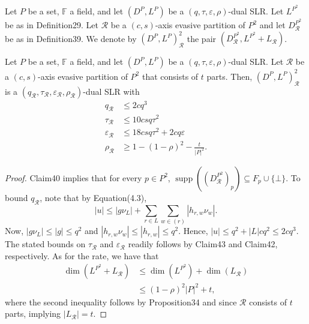 \begin{ntdefinition}
Let $P$ be a set, $\mathbb F$ a field, and let $(D^P,L^P)$ be a $(q,\tau,\varepsilon,\rho)$-dual SLR. Let $L^{P^2}$ be as in Definition29. Let $\mathcal R$ be a $(c,s)$-axis evasive partition of $P^2$ and let $D_{\mathcal R}^{P^2}$ be as in Definition39. We denote by $(D^P,L^P)^2_{\mathcal R}$ the pair $(D_{\mathcal R}^{P^2},L^{P^2}+L_{\mathcal R})$.
\end{ntdefinition}
\begin{ntproposition}
Let $P$ be a set, $\mathbb F$ a field, and let $(D^P,L^P)$ be a $(q,\tau,\varepsilon,\rho)$-dual SLR. Let $\mathcal R$ be a $(c,s)$-axis evasive partition of $P^2$ that consists of $t$ parts. Then, $(D^P,L^P)^2_{\mathcal R}$ is a $(q_{\mathcal R},\tau_{\mathcal R},\varepsilon_{\mathcal R},\rho_{\mathcal R})$-dual SLR with
\begin{align*}q_{\mathcal R}&\leq2cq^3\\\tau_{\mathcal R}&\leq10csq\tau^2\\\varepsilon_{\mathcal R}&\leq18csq\tau^2+2cq\varepsilon\\\rho_{\mathcal R}&\geq1-(1-\rho)^2-\frac t{|P|^2}.\end{align*}
\end{ntproposition}
\begin{proof}
Claim40 implies that for every $p\in P^2$, $\operatorname{supp}((D_{\mathcal R}^{P^2})_p)\subseteq F_p\cup\{\bot\}$. To bound $q_{\mathcal R}$, note that by Equation(4.3),
\[|u|\leq|g\nu_L|+\sum_{r\in L}\sum_{w\in(r)}|h_{r,w}\nu_w|.\]
Now, $|g\nu_L|\leq|g|\leq q^2$ and $|h_{r,w}\nu_w|\leq|h_{r,w}|\leq q^2$. Hence, $|u|\leq q^2+|L|cq^2\leq2cq^3$. The stated bounds on $\tau_{\mathcal R}$ and $\varepsilon_{\mathcal R}$ readily follows by Claim43 and Claim42, respectively. As for the rate, we have that
\begin{align*}\dim(L^{P^2}+L_{\mathcal R})&\leq\dim(L^{P^2})+\dim(L_{\mathcal R})\\&\leq(1-\rho)^2|P|^2+t,\end{align*}
where the second inequality follows by Proposition34 and since $\mathcal R$ consists of $t$ parts, implying $|L_{\mathcal R}|=t$.
\end{proof}

